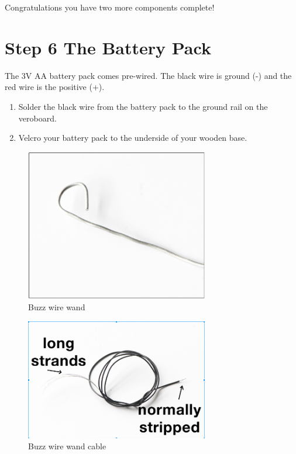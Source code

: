 Congratulations you have two more components complete!



%
\section*{Step 6 The Battery Pack}

The 3V AA battery pack comes pre-wired. The black wire is ground (-) and the red wire is the positive (+).

\begin{enumerate}
	\item Solder the black wire from the battery pack to the ground rail on the veroboard.
	\item Velcro your battery pack to the underside of your wooden base.
\end{enumerate}

%
\begin{figure}[ht]
	\centering
	\includegraphics[width=8cm]{images/wand}
	\caption{Buzz wire wand}
	\label{fig:wand}
\end{figure}
%

%
\begin{figure}[ht]
	\centering
	\includegraphics[width=8cm]{images/wand_cable}
	\caption{Buzz wire wand cable}
	\label{fig:wand_cable}
\end{figure}
%

